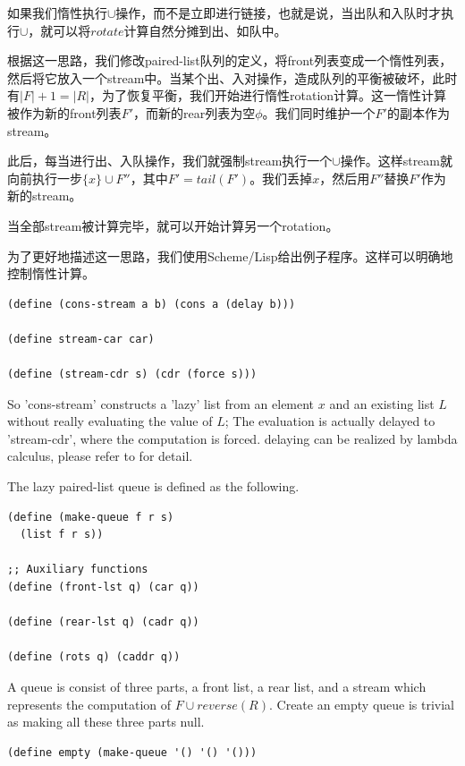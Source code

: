 \documentclass[UTF8]{article}
\begin{document}
如果我们惰性执行$\cup$操作，而不是立即进行链接，也就是说，当出队和入队时才执行$\cup$，就可以将$rotate$计算自然分摊到出、如队中。

根据这一思路，我们修改paired-list队列的定义，将front列表变成一个惰性列表，然后将它放入一个stream中\cite{SICP}。当某个出、入对操作，造成队列的平衡被破坏，此时有$|F| + 1 = |R|$，为了恢复平衡，我们开始进行惰性rotation计算。这一惰性计算被作为新的front列表$F'$，而新的rear列表为空$\phi$。我们同时维护一个$F'$的副本作为stream。

此后，每当进行出、入队操作，我们就强制stream执行一个$\cup$操作。这样stream就向前执行一步$ \{ x \} \cup F''$，其中$F' = tail(F')$。我们丢掉$x$，然后用$F''$替换$F'$作为新的stream。

当全部stream被计算完毕，就可以开始计算另一个rotation。

为了更好地描述这一思路，我们使用Scheme/Lisp给出例子程序。这样可以明确地控制惰性计算。

\lstset{language=Lisp}
\begin{lstlisting}
(define (cons-stream a b) (cons a (delay b)))

(define stream-car car)

(define (stream-cdr s) (cdr (force s)))
\end{lstlisting}

So 'cons-stream' constructs a 'lazy' list from an element $x$
and an existing list $L$ without really evaluating
the value of $L$; The evaluation is actually delayed to
'stream-cdr', where the computation is forced. delaying can
be realized by lambda calculus, please refer to \cite{SICP} for
detail.

The lazy paired-list queue is defined as the following.

\lstset{language=Lisp}
\begin{lstlisting}
(define (make-queue f r s)
  (list f r s))

;; Auxiliary functions
(define (front-lst q) (car q))

(define (rear-lst q) (cadr q))

(define (rots q) (caddr q))
\end{lstlisting}

A queue is consist of three parts, a front list, a rear list,
and a stream which represents the computation of $F \cup reverse(R)$.
Create an empty queue is trivial as making all these three parts
null.

\begin{lstlisting}
(define empty (make-queue '() '() '()))
\end{lstlisting}
\end{document}
